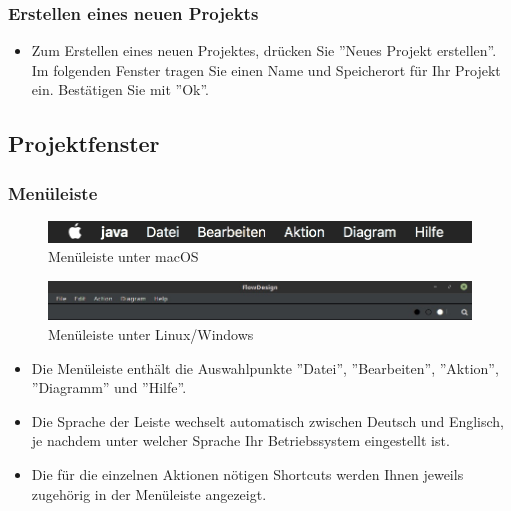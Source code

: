 \subsubsection{Erstellen eines neuen Projekts}
\begin{itemize}
\item Zum Erstellen eines neuen Projektes, drücken Sie ''Neues Projekt erstellen''. Im folgenden Fenster tragen Sie einen Name und Speicherort für Ihr Projekt ein. Bestätigen Sie mit ''Ok''.  
\end{itemize}

\subsection{Projektfenster}
\subsubsection{Menüleiste}
\begin{figure}[h!]
	\centering
	\includegraphics[width=1.0\textwidth]{Leiste.png}
	\caption{Menüleiste unter macOS}
\end{figure}

\begin{figure}[h!]
	\centering
	\includegraphics[width=1.0\textwidth]{Leiste2.jpg}
	\caption{Menüleiste unter Linux/Windows}
\end{figure}


\begin{itemize}
\item Die Menüleiste enthält die Auswahlpunkte ''Datei'', ''Bearbeiten'', ''Aktion'', ''Diagramm'' und ''Hilfe''.
\item Die Sprache der Leiste wechselt automatisch zwischen Deutsch und Englisch, je nachdem unter welcher Sprache Ihr Betriebssystem eingestellt ist.
\item Die für die einzelnen Aktionen nötigen Shortcuts werden Ihnen jeweils zugehörig in der Menüleiste angezeigt. 
\end{itemize}



